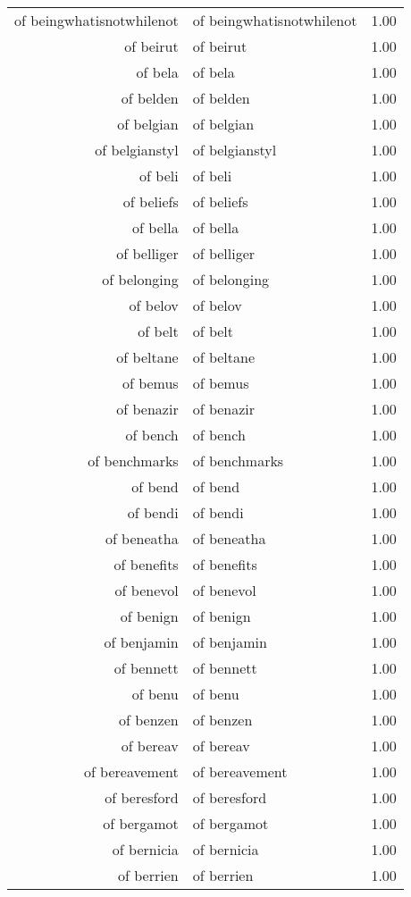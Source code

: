 \begin{table}[ht]
\begin{tabular}{rlr}
  of beingwhatisnotwhilenot & of beingwhatisnotwhilenot & 1.00 \\ 
  of beirut & of beirut & 1.00 \\ 
  of bela & of bela & 1.00 \\ 
  of belden & of belden & 1.00 \\ 
  of belgian & of belgian & 1.00 \\ 
  of belgianstyl & of belgianstyl & 1.00 \\ 
  of beli & of beli & 1.00 \\ 
  of beliefs & of beliefs & 1.00 \\ 
  of bella & of bella & 1.00 \\ 
  of belliger & of belliger & 1.00 \\ 
  of belonging & of belonging & 1.00 \\ 
  of belov & of belov & 1.00 \\ 
  of belt & of belt & 1.00 \\ 
  of beltane & of beltane & 1.00 \\ 
  of bemus & of bemus & 1.00 \\ 
  of benazir & of benazir & 1.00 \\ 
  of bench & of bench & 1.00 \\ 
  of benchmarks & of benchmarks & 1.00 \\ 
  of bend & of bend & 1.00 \\ 
  of bendi & of bendi & 1.00 \\ 
  of beneatha & of beneatha & 1.00 \\ 
  of benefits & of benefits & 1.00 \\ 
  of benevol & of benevol & 1.00 \\ 
  of benign & of benign & 1.00 \\ 
  of benjamin & of benjamin & 1.00 \\ 
  of bennett & of bennett & 1.00 \\ 
  of benu & of benu & 1.00 \\ 
  of benzen & of benzen & 1.00 \\ 
  of bereav & of bereav & 1.00 \\ 
  of bereavement & of bereavement & 1.00 \\ 
  of beresford & of beresford & 1.00 \\ 
  of bergamot & of bergamot & 1.00 \\ 
  of bernicia & of bernicia & 1.00 \\ 
  of berrien & of berrien & 1.00 \\ 

\end{tabular}
\end{table}
